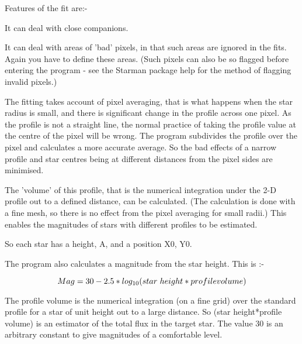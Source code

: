{{ Features of the fit are:-

\begin{list}{{-}}{}
\item It can deal with close companions.
\item It can deal with areas of 'bad' pixels, in that such areas are
     ignored in the fits. Again you have to define these areas. (Such
     pixels can also be so flagged before entering the program - see
     the Starman package help for the method of flagging invalid
     pixels.)
\end{list}                                                                               
                                                                               
  The fitting takes account of pixel averaging, that is what happens
  when the star radius is small, and there is significant change in
  the profile across one pixel. As the profile is not a straight line,
  the normal practice of taking the profile value at the centre of the
  pixel will be wrong. The program subdivides the profile over the
  pixel and calculates a more accurate average. So the bad effects of
  a narrow profile and star centres being at different distances from
  the pixel sides are minimised.
                                                                               
  The 'volume' of this profile, that is the numerical integration under
  the 2-D profile out to a defined distance, can be calculated. (The
  calculation is done with a fine mesh, so there is no effect from the
  pixel averaging for small radii.) This enables the magnitudes of
  stars with different profiles to be estimated.
                                                                               
                                                                               
   So each star has a height, A, and a position X0, Y0.
                                                                               
                                                                               
   The program also calculates a magnitude from the star height. This
   is :-

$$   Mag  =  30  -  2.5*log_{10}(star{\hspace{0.3em}}height*profile volume) $$

   The profile volume is the numerical integration (on a fine grid)
   over the standard profile for a star of unit height out to a large
   distance. So (star height*profile volume) is an estimator of the
   total flux in the target star.
   The value 30 is an arbitrary constant to give magnitudes of a
   comfortable level.
                                                                               
}}
